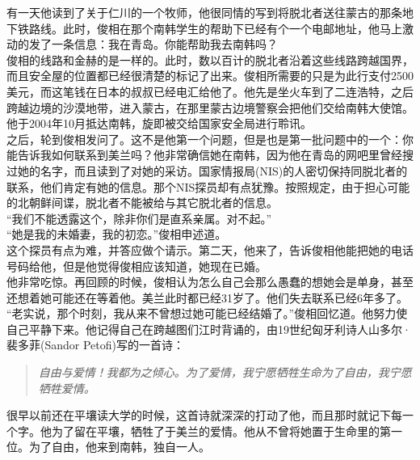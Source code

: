 有一天他读到了关于仁川的一个牧师，他很同情的写到将脱北者送往蒙古的那条地下铁路线。此时，俊相在那个南韩学生的帮助下已经有个一个电邮地址，他马上激动的发了一条信息：我在青岛。你能帮助我去南韩吗？\\

俊相的线路和金赫的是一样的。此时，数以百计的脱北者沿着这些线路跨越国界，而且安全屋的位置都已经很清楚的标记了出来。俊相所需要的只是为此行支付2500美元，而这笔钱在日本的叔叔已经电汇给他了。他先是坐火车到了二连浩特，之后跨越边境的沙漠地带，进入蒙古，在那里蒙古边境警察会把他们交给南韩大使馆。他于2004年10月抵达南韩，旋即被交给国家安全局进行聆讯。\\

之后，轮到俊相发问了。这不是他第一个问题，但是也是第一批问题中的一个：你能告诉我如何联系到美兰吗？他非常确信她在南韩，因为他在青岛的网吧里曾经搜过她的名字，而且读到了对她的采访。国家情报局(NIS)的人密切保持同脱北者的联系，他们肯定有她的信息。那个NIS探员却有点犹豫。按照规定，由于担心可能的北朝鲜间谍，脱北者不能被给与其它脱北者的信息。\\

“我们不能透露这个，除非你们是直系亲属。对不起。”\\

“她是我的未婚妻，我的初恋。”俊相申述道。\\

这个探员有点为难，并答应做个请示。第二天，他来了，告诉俊相他能把她的电话号码给他，但是他觉得俊相应该知道，她现在已婚。\\

他非常吃惊。再回顾的时候，俊相认为怎么自己会那么愚蠢的想她会是单身，甚至还想着她可能还在等着他。美兰此时都已经31岁了。他们失去联系已经6年多了。\\

“老实说，那个时刻，我从来不曾想过她可能已经结婚了。”俊相回忆道。他努力使自己平静下来。他记得自己在跨越图们江时背诵的，由19世纪匈牙利诗人山多尔·裴多菲(Sandor Petofi)写的一首诗：\\

\begin{quote}
	\begin{spacing}{1.0}  %
		\textit{{\footnotesize 自由与爱情！我都为之倾心。为了爱情，我宁愿牺牲生命为了自由，我宁愿牺牲爱情。\\}}
	\end{spacing}
\end{quote}

很早以前还在平壤读大学的时候，这首诗就深深的打动了他，而且那时就记下每一个字。他为了留在平壤，牺牲了于美兰的爱情。他从不曾将她置于生命里的第一位。为了自由，他来到南韩，独自一人。\\

